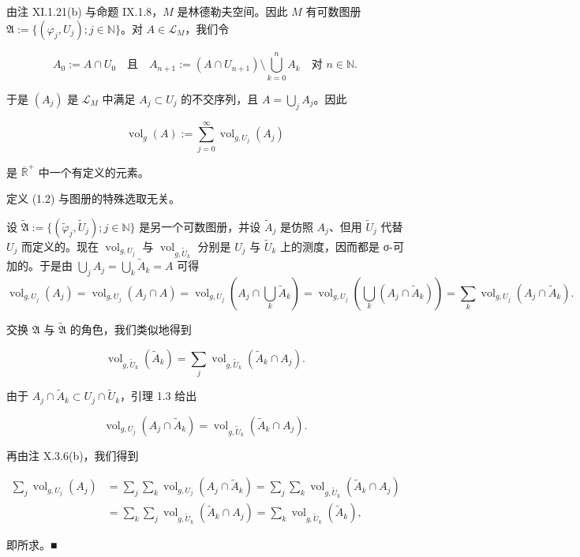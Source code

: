由注 XI.1.21(b) 与命题 IX.1.8，$ M $ 是林德勒夫空间。因此 $ M $ 有可数图册 $ \mathfrak{A} := \{(\varphi_j, U_j) ; j \in \mathbb{N}\} $。对 $ A \in \mathcal{L}_M $，我们令

\[
A_0 := A \cap U_0 \quad \text{且} \quad A_{n+1} := (A \cap U_{n+1}) \setminus \bigcup_{k=0}^{n} A_k \quad \text{对 } n \in \mathbb{N} .
\]

于是 $ (A_j) $ 是 $ \mathcal{L}_M $ 中满足 $ A_j \subset U_j $ 的不交序列，且 $ A = \bigcup_j A_j $。因此

\begin{equation}
\operatorname{vol}_g(A) := \sum_{j=0}^{\infty} \operatorname{vol}_{g,U_j}(A_j)\tag{1.2}
\end{equation}

是 $ \overline{\mathbb{R}}^+ $ 中一个有定义的元素。

\begin{lemma}

定义 (1.2) 与图册的特殊选取无关。

\proofhead
设 $ \widetilde{\mathfrak{A}} := \{(\tilde{\varphi}_j, \tilde{U}_j) ; j \in \mathbb{N}\} $ 是另一个可数图册，并设 $ \tilde{A}_j $ 是仿照 $ A_j $、但用 $ \tilde{U}_j $ 代替 $ U_j $ 而定义的。现在 $ \operatorname{vol}_{g,U_j} $ 与 $ \operatorname{vol}_{g,\tilde{U}_k} $ 分别是 $ U_j $ 与 $ \tilde{U}_k $ 上的测度，因而都是 σ-可加的。于是由 $ \bigcup_j A_j = \bigcup_k \tilde{A}_k = A $ 可得
\[
\operatorname{vol}_{g,U_j}(A_j) = \operatorname{vol}_{g,U_j}(A_j \cap A) = \operatorname{vol}_{g,U_j}\left(A_j \cap \bigcup_k \tilde{A}_k\right) = \operatorname{vol}_{g,U_j}\left(\bigcup_k (A_j \cap \tilde{A}_k)\right) = \sum_k \operatorname{vol}_{g,U_j}(A_j \cap \tilde{A}_k) .
\]

交换 $ \mathfrak{A} $ 与 $ \widetilde{\mathfrak{A}} $ 的角色，我们类似地得到

\[
\operatorname{vol}_{g,\tilde{U}_k}(\tilde{A}_k) = \sum_j \operatorname{vol}_{g,\tilde{U}_k}(\tilde{A}_k \cap A_j) .
\]

由于 $ A_j \cap \tilde{A}_k \subset U_j \cap \tilde{U}_k $，引理 1.3 给出

\[
\operatorname{vol}_{g,U_j}(A_j \cap \tilde{A}_k) = \operatorname{vol}_{g,\tilde{U}_k}(\tilde{A}_k \cap A_j) .
\]

再由注 X.3.6(b)，我们得到

\begin{equation*}
\begin{aligned}
\sum_j \operatorname{vol}_{g,U_j}(A_j) &= \sum_j \sum_k \operatorname{vol}_{g,U_j}(A_j \cap \tilde{A}_k) = \sum_j \sum_k \operatorname{vol}_{g,\tilde{U}_k}(\tilde{A}_k \cap A_j) \\ &= \sum_k \sum_j \operatorname{vol}_{g,\tilde{U}_k}(\tilde{A}_k \cap A_j) = \sum_k \operatorname{vol}_{g,\tilde{U}_k}(\tilde{A}_k) ,
\end{aligned}
\end{equation*}

即所求。\nobreak\hspace{0.35em}■

\end{lemma}

